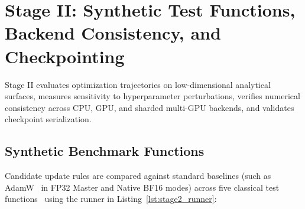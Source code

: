 \documentclass[11pt,a4paper]{article}
\renewcommand{\_}{\origunderscore\allowbreak}
\begin{document}
\section{Stage II: Synthetic Test Functions, Backend Consistency, and Checkpointing}
\noindent
Stage II evaluates optimization trajectories on low-dimensional analytical surfaces, measures sensitivity to hyperparameter perturbations, verifies numerical consistency across CPU, GPU, and sharded multi-GPU backends, and validates checkpoint serialization.

\subsection{Synthetic Benchmark Functions}
\noindent
Candidate update rules are compared against standard baselines (such as AdamW~\cite{loshchilov2019adamw} in FP32 Master and Native BF16 modes) across five classical test functions~\cite{jamil2013survey} using the runner in Listing~\ref{lst:stage2_runner}:
\end{document}
